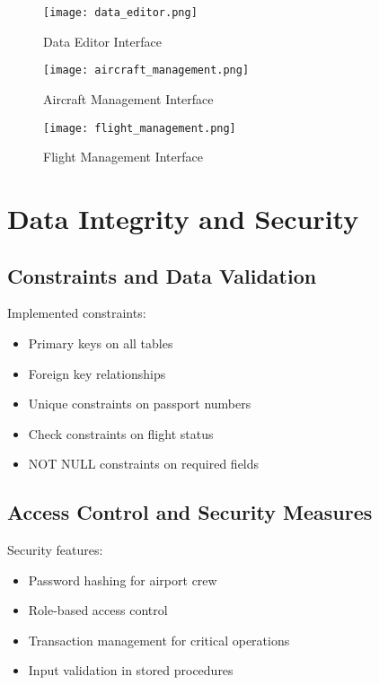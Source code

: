 \documentclass[a4paper,12pt]{article}
\begin{document}
\begin{figure}[h]
\centering
\texttt{[image: data\_editor.png]}
\caption{Data Editor Interface}
\label{fig:data_editor}
\end{figure}

\begin{figure}[h]
\centering
\texttt{[image: aircraft\_management.png]}
\caption{Aircraft Management Interface}
\label{fig:aircraft_management}
\end{figure}

\begin{figure}[h]
\centering
\texttt{[image: flight\_management.png]}
\caption{Flight Management Interface}
\label{fig:flight_management}
\end{figure}

\section{Data Integrity and Security}
\subsection{Constraints and Data Validation}
Implemented constraints:
\begin{itemize}
    \item Primary keys on all tables
    \item Foreign key relationships
    \item Unique constraints on passport numbers
    \item Check constraints on flight status
    \item NOT NULL constraints on required fields
\end{itemize}

\subsection{Access Control and Security Measures}
Security features:
\begin{itemize}
    \item Password hashing for airport crew
    \item Role-based access control
    \item Transaction management for critical operations
    \item Input validation in stored procedures
\end{itemize}
\end{document}
